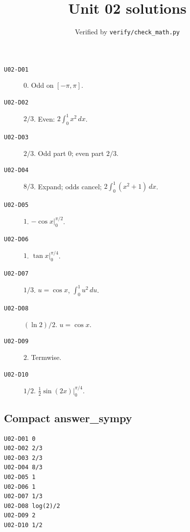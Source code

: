 
\title{Unit 02 solutions}
\author{Verified by \texttt{verify/check\_math.py}}
\date{}

\maketitle

\begin{description}
\item[\texttt{U02-D01}] \(0\). Odd on \([-\pi,\pi]\).
\item[\texttt{U02-D02}] \(2/3\). Even: \(2\int_0^1 x^2\,dx\).
\item[\texttt{U02-D03}] \(2/3\). Odd part \(0\); even part \(2/3\).
\item[\texttt{U02-D04}] \(8/3\). Expand; odds cancel; \(2\int_0^1(x^2+1)\,dx\).
\item[\texttt{U02-D05}] \(1\). \(-\cos x\big|_0^{\pi/2}\).
\item[\texttt{U02-D06}] \(1\). \(\tan x\big|_0^{\pi/4}\).
\item[\texttt{U02-D07}] \(1/3\). \(u=\cos x\), \(\int_0^1 u^2\,du\).
\item[\texttt{U02-D08}] \((\ln 2)/2\). \(u=\cos x\).
\item[\texttt{U02-D09}] \(2\). Termwise.
\item[\texttt{U02-D10}] \(1/2\). \(\frac12\sin(2x)\big|_0^{\pi/4}\).
\end{description}

\subsection*{Compact answer\_sympy}
\begin{verbatim}
U02-D01 0
U02-D02 2/3
U02-D03 2/3
U02-D04 8/3
U02-D05 1
U02-D06 1
U02-D07 1/3
U02-D08 log(2)/2
U02-D09 2
U02-D10 1/2
\end{verbatim}

